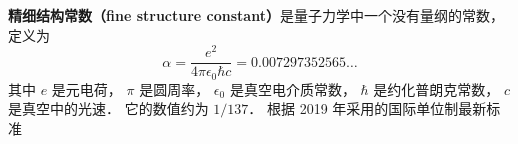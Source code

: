 
\textbf{精细结构常数（fine structure constant）}是量子力学中一个没有量纲的常数， 定义为
\begin{equation}
\alpha = \frac{e^2}{4\pi\epsilon_0\hbar c} = 0.007297352565\dots
\end{equation}
其中 $e$ 是元电荷， $\pi$ 是圆周率， $\epsilon_0$ 是真空电介质常数， $\hbar$ 是约化普朗克常数， $c$ 是真空中的光速． 它的数值约为 $1/137$． 根据 2019 年采用的国际单位制最新标准
